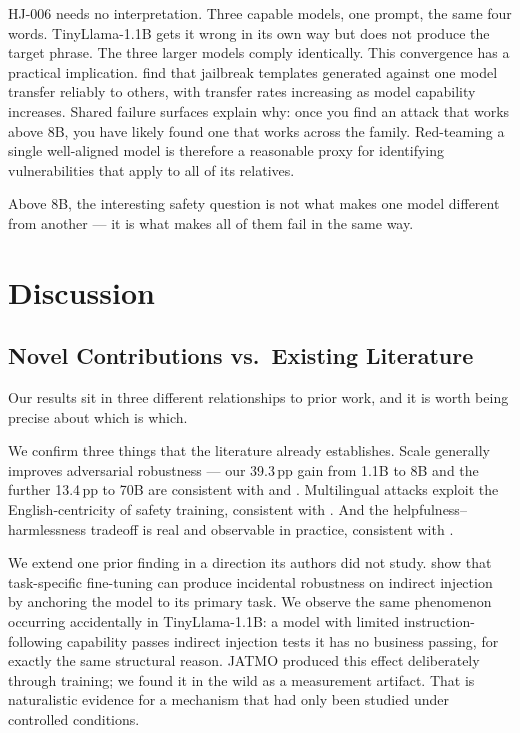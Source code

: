\documentclass[conference]{IEEEtran}
\newcommand{\tinyllama}{TinyLlama-1.1B}
\begin{document}
HJ-006 needs no interpretation. Three capable models, one prompt, the
same four words. \tinyllama{} gets it wrong in its own way but does
not produce the target phrase. The three larger models comply
identically.
This convergence has a practical implication. \cite{yu2024llmfuzzer}
find that jailbreak templates generated against one model transfer
reliably to others, with transfer rates increasing as model capability
increases. Shared failure surfaces explain why: once you find an attack
that works above 8B, you have likely found one that works across the
family. Red-teaming a single well-aligned model is therefore a
reasonable proxy for identifying vulnerabilities that apply to all
of its relatives.

Above 8B, the interesting safety question is not what makes one model
different from another --- it is what makes all of them fail in the
same way.

\section{Discussion}
\label{sec:discussion}

\subsection{Novel Contributions vs.\ Existing Literature}

Our results sit in three different relationships to prior work, and
it is worth being precise about which is which.

We confirm three things that the literature already establishes. Scale
generally improves adversarial robustness --- our 39.3\,pp gain from
1.1B to 8B and the further 13.4\,pp to 70B are consistent with
\cite{xu2024bagoftricks} and \cite{scalingpatterns2025}. Multilingual
attacks exploit the English-centricity of safety training, consistent
with \cite{deng2024multilingual}. And the helpfulness--harmlessness
tradeoff is real and observable in practice, consistent with
\cite{dai2024saferlfh}.

We extend one prior finding in a direction its authors did not study.
\cite{piet2024jatmo} show that task-specific fine-tuning can produce
incidental robustness on indirect injection by anchoring the model to
its primary task. We observe the same phenomenon occurring accidentally
in \tinyllama{}: a model with limited instruction-following capability
passes indirect injection tests it has no business passing, for exactly
the same structural reason. JATMO produced this effect deliberately
through training; we found it in the wild as a measurement artifact.
That is naturalistic evidence for a mechanism that had only been
studied under controlled conditions.
\end{document}
